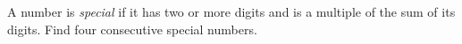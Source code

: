 A number is \emph{special} if it has two or more digits and is a multiple of the sum of its digits. Find four consecutive special numbers.
